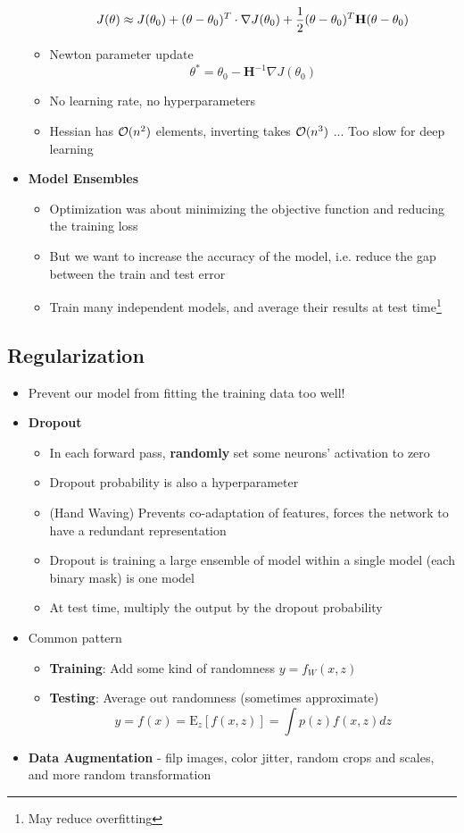 \begin{itemize}
\begin{itemize}
		$$J(\theta) \approx J(\theta_0) + (\theta - \theta_0)^T \cdot \nabla J(\theta_0) + \frac{1}{2}(\theta - \theta_0)^T \mathbf{H} (\theta - \theta_0)$$
		\item Newton parameter update
		$$\theta^\ast = \theta_0 - \mathbf{H}^{-1} \nabla J(\theta_0)$$
		\item No learning rate, no hyperparameters
		\item Hessian has $\mathcal{O}(n^2)$ elements, inverting takes $\mathcal{O}(n^3)$ ... Too slow for deep learning
	\end{itemize}
	\item \textbf{Model Ensembles}
	\begin{itemize}
		\item Optimization was about minimizing the objective function and reducing the training loss
		\item But we want to increase the accuracy of the model, i.e. reduce the gap between the train and test error
		\item Train many independent models, and average their results at test time\footnote{May reduce overfitting}
	\end{itemize}
\end{itemize}

\subsection{Regularization}
\begin{itemize}
	\item Prevent our model from fitting the training data too well!
	\item \textbf{Dropout}
	\begin{itemize}
		\item In each forward pass, \textbf{randomly} set some neurons' activation to zero
		\item Dropout probability is also a hyperparameter
		\item (Hand Waving) Prevents co-adaptation of features, forces the network to have a redundant representation
		\item Dropout is training a large ensemble of model within a single model (each binary mask) is one model
		\item At test time, multiply the output by the dropout probability
	\end{itemize}
	\item Common pattern
	\begin{itemize}
		\item \textbf{Training}: Add some kind of randomness $y = f_W(x, z)$
		\item \textbf{Testing}: Average out randomness (sometimes approximate) $$y = f(x) = \mathrm{E}_z\left[f(x, z)\right] = \int p(z)f(x, z)dz$$
	\end{itemize}
	\item \textbf{Data Augmentation} - filp images, color jitter, random crops and scales, and more random transformation
\end{itemize}


